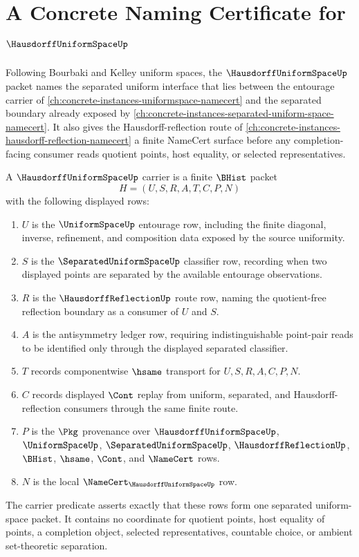 \chapter{A Concrete Naming Certificate for $\HausdorffUniformSpaceUp$}
\label{ch:concrete-instances-hausdorff-uniform-space-namecert}

Following Bourbaki and Kelley uniform spaces, the $\HausdorffUniformSpaceUp$ packet names the separated uniform interface that lies between the entourage carrier of \autoref{ch:concrete-instances-uniformspace-namecert} and the separated boundary already exposed by \autoref{ch:concrete-instances-separated-uniform-space-namecert}. It also gives the Hausdorff-reflection route of \autoref{ch:concrete-instances-hausdorff-reflection-namecert} a finite NameCert surface before any completion-facing consumer reads quotient points, host equality, or selected representatives.

\begin{definition}
\label{def:hausdorff-uniform-space-carrier}
A $\HausdorffUniformSpaceUp$ carrier is a finite $\BHist$ packet
$$
H=(U,S,R,A,T,C,P,N)
$$
with the following displayed rows:
\begin{enumerate}
\item $U$ is the $\UniformSpaceUp$ entourage row, including the finite diagonal, inverse, refinement, and composition data exposed by the source uniformity.
\item $S$ is the $\SeparatedUniformSpaceUp$ classifier row, recording when two displayed points are separated by the available entourage observations.
\item $R$ is the $\HausdorffReflectionUp$ route row, naming the quotient-free reflection boundary as a consumer of $U$ and $S$.
\item $A$ is the antisymmetry ledger row, requiring indistinguishable point-pair reads to be identified only through the displayed separated classifier.
\item $T$ records componentwise $\hsame$ transport for $U,S,R,A,C,P,N$.
\item $C$ records displayed $\Cont$ replay from uniform, separated, and Hausdorff-reflection consumers through the same finite route.
\item $P$ is the $\Pkg$ provenance over $\HausdorffUniformSpaceUp$, $\UniformSpaceUp$, $\SeparatedUniformSpaceUp$, $\HausdorffReflectionUp$, $\BHist$, $\hsame$, $\Cont$, and $\NameCert$ rows.
\item $N$ is the local $\NameCert_{\HausdorffUniformSpaceUp}$ row.
\end{enumerate}
The carrier predicate asserts exactly that these rows form one separated uniform-space packet. It contains no coordinate for quotient points, host equality of points, a completion object, selected representatives, countable choice, or ambient set-theoretic separation.
\end{definition}

